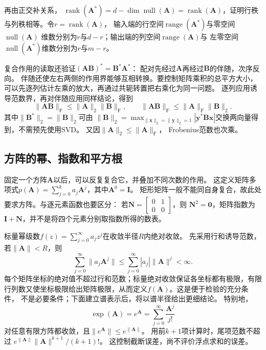 再由正交补关系，
$\operatorname{rank}(\bm A^*)=d-\dim\operatorname{null}(\bm A)
=\operatorname{rank}(\bm A)$，证明行秩与列秩相等。令$r=\operatorname{rank}(\bm A)$，
输入端的行空间$\operatorname{range}(\bm A^*)$与零空间$\operatorname{null}(\bm A)$
维数分别为$r$与$d-r$；输出端的列空间$\operatorname{range}(\bm A)$与
左零空间$\operatorname{null}(\bm A^*)$维数分别为$r$与$m-r$。


复合作用的读取还验证$(\bm A\bm B)^*=\bm B^*\bm A^*$：
配对先经过$\bm A$再经过$\bm B$的伴随，次序反向。
伴随还使左右两侧的作用界能够互相转换。要控制矩阵乘积的总平方大小，
可以先逐列估计左乘的放大，再通过共轭转置把右乘化为同一问题。
逐列应用诱导范数界，再对伴随应用同样结论，得到
\begin{equation}
 \lVert\bm A\bm B\rVert_{\mathrm F}
 \leq\lVert\bm A\rVert_2\lVert\bm B\rVert_{\mathrm F},
 \qquad
 \lVert\bm A\bm B\rVert_{\mathrm F}
 \leq\lVert\bm A\rVert_{\mathrm F}\lVert\bm B\rVert_2.
 \label{eq:matrix-analysis-mixed-submultiplicativity}
\end{equation}
其中$\lVert\bm B^*\rVert_2=\lVert\bm B\rVert_2$可由
$\lVert\bm B\rVert_2=\max_{\lVert\bm x\rVert_2=\lVert\bm y\rVert_2=1}
|\bm y^*\bm B\bm x|$交换两向量得到，不需预先使用SVD。
又因$\lVert\bm A\rVert_2\leq\lVert\bm A\rVert_{\mathrm F}$，
Frobenius范数也次乘。

\subsection{方阵的幂、指数和平方根}
\label{sec:matrix-analysis-functions-structured-operations}
\label{sec:ch06-powers-spectrum}
\label{sec:matrix-analysis-spectrum}
\label{sec:ch06-triangular-spectrum}

固定一个方阵$\bm A$以后，可以反复复合它，并叠加不同次数的作用。
这定义矩阵多项式$p(\bm A)=\sum_{j=0}^k a_j\bm A^j$，其中$\bm A^0=\bm I$。
矩形矩阵一般不能同自身复合，故此处要求方阵。与逐元素函数也要区分：
若$\bm N=\left[\begin{smallmatrix}0&1\\0&0\end{smallmatrix}\right]$，则
$\bm N^2=\bm0$，矩阵指数为$\bm I+\bm N$，并不是将四个元素分别取指数所得的数表。

标量幂级数$f(z)=\sum_{j=0}^{\infty}a_jz^j$在收敛半径$R$内绝对收敛。
先采用行和诱导范数，若$\lVert\bm A\rVert<R$，则
\[
 \sum_{j=0}^\infty\lVert a_j\bm A^j\rVert
 \leq\sum_{j=0}^\infty|a_j|\lVert\bm A\rVert^j<\infty.
\]
每个矩阵坐标的绝对值不超过行和范数；标量绝对收敛保证各坐标都有极限，有限行列数又使坐标极限给出矩阵极限，从而定义$f(\bm A)$。这是便于检验的充分条件，
不是必要条件；下面建立谱表示后，将以谱半径给出更细结论。
特别地，
\begin{equation}
 \exp(\bm A)=e^{\bm A}=\sum_{j=0}^{\infty}\frac{\bm A^j}{j!}
 \label{eq:matrix-analysis-matrix-exponential}
\end{equation}
对任意有限方阵都收敛，且$\lVert e^{\bm A}\rVert\leq e^{\lVert\bm A\rVert}$。
用前$k+1$项计算时，尾项范数不超过
$e^{\lVert\bm A\rVert}\lVert\bm A\rVert^{k+1}/(k+1)!$。
这控制截断误差，尚不评价浮点求和的误差。

